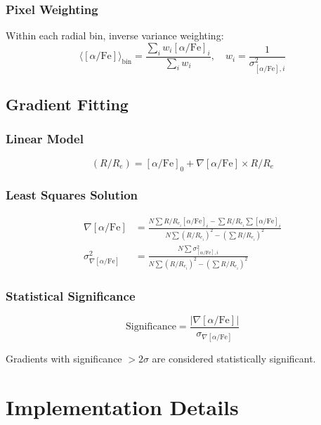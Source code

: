 \documentclass[12pt,a4paper]{article}
\newcommand{\alphaFe}{[\alpha/\text{Fe}]}
\newcommand{\RRe}{R/R_e}
\begin{document}
\subsubsection{Pixel Weighting}
Within each radial bin, inverse variance weighting:
\begin{equation}
\langle \alphaFe \rangle_{\text{bin}} = \frac{\sum_i w_i \alphaFe_i}{\sum_i w_i}, \quad w_i = \frac{1}{\sigma_{\alphaFe,i}^2}
\end{equation}

\subsection{Gradient Fitting}

\subsubsection{Linear Model}
\begin{equation}
\alphaFe(\RRe) = \alphaFe_0 + \nabla\alphaFe \times \RRe
\end{equation}

\subsubsection{Least Squares Solution}
\begin{align}
\nabla\alphaFe &= \frac{N\sum \RRe_i \alphaFe_i - \sum \RRe_i \sum \alphaFe_i}{N\sum (\RRe_i)^2 - (\sum \RRe_i)^2} \\
\sigma_{\nabla\alphaFe}^2 &= \frac{N \sum \sigma_{\alphaFe,i}^2}{N\sum (\RRe_i)^2 - (\sum \RRe_i)^2}
\end{align}

\subsubsection{Statistical Significance}
\begin{equation}
\text{Significance} = \frac{|\nabla\alphaFe|}{\sigma_{\nabla\alphaFe}}
\end{equation}

Gradients with significance $> 2\sigma$ are considered statistically significant.

\section{Implementation Details}
\end{document}
